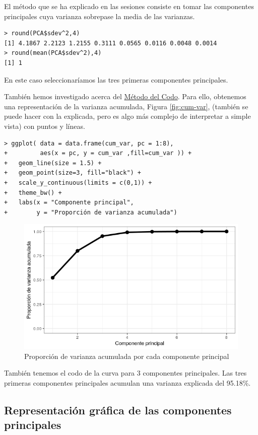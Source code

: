 \documentclass[12pt]{article}
\begin{document}
El método que se ha explicado en las sesiones consiste en tomar las
componentes principales cuya varianza sobrepase la media de las
varianzas.
\begin{verbatim}
> round(PCA$sdev^2,4)
[1] 4.1867 2.2123 1.2155 0.3111 0.0565 0.0116 0.0048 0.0014
> round(mean(PCA$sdev^2),4)
[1] 1
\end{verbatim}
En este caso seleccionaríamos las tres primeras componentes principales.

También hemos investigado acerca del
\href{https://en.wikipedia.org/wiki/Elbow_method_%28clustering%29}
  {Método del Codo}.
  Para ello, obtenemos una representación de la varianza acumulada,
  Figura \ref{fig:cum-var}, (también se puede hacer con la explicada,
  pero es algo más complejo de interpretar a simple vista) con puntos
  y líneas.
  \begin{verbatim}
> ggplot( data = data.frame(cum_var, pc = 1:8),
+         aes(x = pc, y = cum_var ,fill=cum_var )) +
+   geom_line(size = 1.5) +
+   geom_point(size=3, fill="black") +
+   scale_y_continuous(limits = c(0,1)) +
+   theme_bw() +
+   labs(x = "Componente principal",
+        y = "Proporción de varianza acumulada")
\end{verbatim}

\begin{figure}[H]
  \centering
  \includegraphics[width=120mm]{imgs/elbow}
  \caption{Proporción de varianza acumulada por cada componente principal}
  \label{fig:elbow}
\end{figure}

También tenemos el codo de la curva para 3 componentes
principales. Las tres primeras componentes principales acumulan una
varianza explicada del 95.18\%.

\pagebreak

\subsection{Representación gráfica de las componentes principales}
\end{document}
